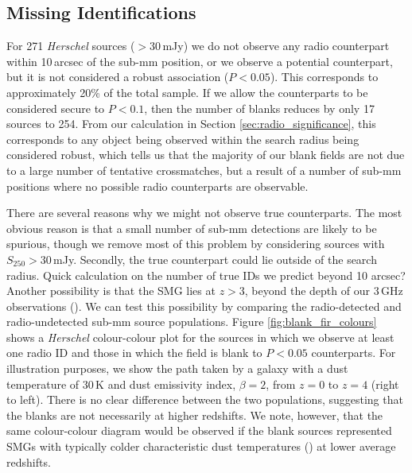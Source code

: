 \subsection{Missing Identifications}

For 271 \textit{Herschel} sources ($> 30\,$mJy) we do not observe any radio counterpart within 10\,arcsec of the sub-mm position, or we observe a potential counterpart, but it is not considered a robust association ($P < 0.05$). This corresponds to approximately 20\% of the total sample. If we allow the counterparts to be considered secure to $P < 0.1$, then the number of blanks reduces by only 17 sources to 254. From our calculation in Section \ref{sec:radio_significance}, this corresponds to any object being observed within the search radius being considered robust, which tells us that the majority of our blank fields are not due to a large number of tentative crossmatches, but a result of a number of sub-mm positions where no possible radio counterparts are observable.

There are several reasons why we might not observe true counterparts. The most obvious reason is that a small number of sub-mm detections are likely to be spurious, though we remove most of this problem by considering sources with $S_{250} > 30\,$mJy. Secondly, the true counterpart could lie outside of the search radius. {\color{red}Quick calculation on the number of true IDs we predict beyond 10 arcsec?} Another possibility is that the SMG lies at $z > 3$, beyond the depth of our 3\,GHz observations (\citealt{Eales_2003}). We can test this possibility by comparing the radio-detected and radio-undetected sub-mm source populations. Figure \ref{fig:blank_fir_colours} shows a \textit{Herschel} colour-colour plot for the sources in which we observe at least one radio ID and those in which the field is blank to $P < 0.05$ counterparts. For illustration purposes, we show the path taken by a galaxy with a dust temperature of 30\,K and dust emissivity index, $\beta = 2$, from $z = 0$ to $z = 4$ (right to left). There is no clear difference between the two populations, suggesting that the blanks are not necessarily at higher redshifts. We note, however, that the same colour-colour diagram would be observed if the blank sources represented SMGs with typically colder characteristic dust temperatures (\citealt{Chapman_2004}) at lower average redshifts.

